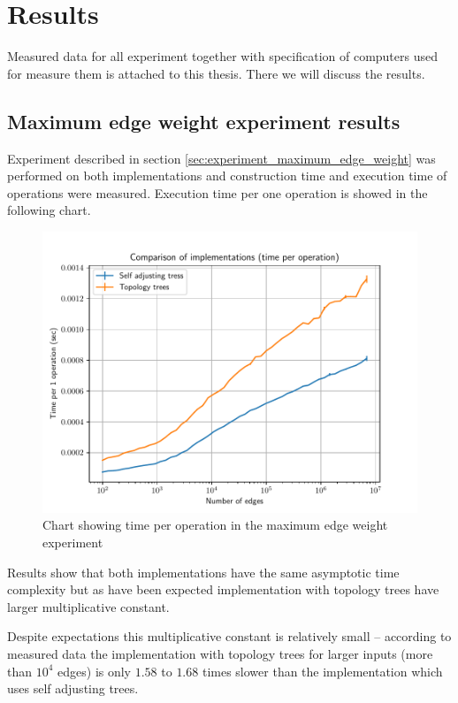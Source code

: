 \chapter{Results}
\label{chap:Results}

Measured data for all experiment together with specification of computers used
for measure them is attached to this thesis. There we will discuss the results.

\section{Maximum edge weight experiment results}
\label{sec:results_maximum_edge_weight}

Experiment described in section \ref{sec:experiment_maximum_edge_weight} was
performed on both implementations and construction time and execution time of
operations were measured. Execution time per one operation is showed in the
following chart.

\begin{figure}[H]
\centering
{}\hsize
\includegraphics[width=\hsize]{charts/maximum_edge_weight_op.pdf}
\caption{Chart showing time per operation in the maximum edge weight experiment}
\end{figure}

Results show that both implementations have the same asymptotic time complexity
but as have been expected implementation with topology trees have larger
multiplicative constant.

Despite expectations this multiplicative constant is relatively small --
according to measured data the implementation with topology trees for larger
inputs (more than $10^4$ edges) is only $1.58$ to $1.68$ times slower than the
implementation which uses self adjusting trees.

